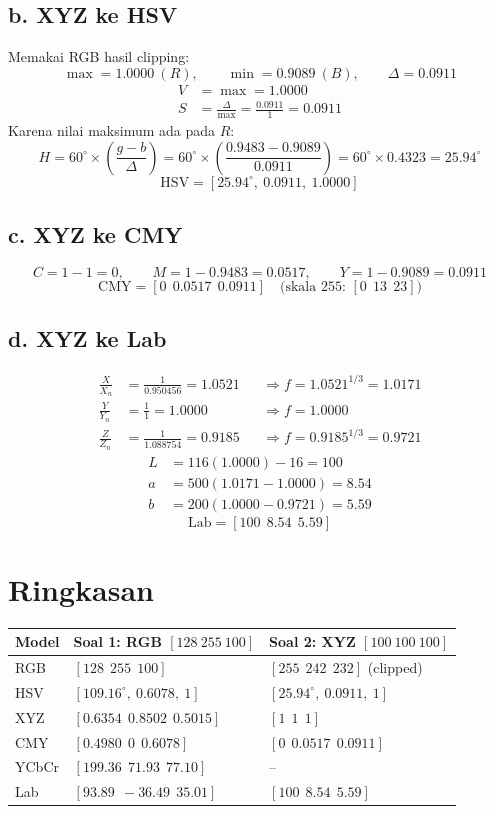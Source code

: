 \documentclass[11pt,a4paper]{article}
\begin{document}
\subsection*{b. XYZ ke HSV}
Memakai RGB hasil clipping:
\[
\max = 1.0000\ (R),\qquad \min = 0.9089\ (B),\qquad \Delta = 0.0911
\]
\begin{align*}
V &= \max = 1.0000\\
S &= \frac{\Delta}{\max} = \frac{0.0911}{1} = 0.0911
\end{align*}
Karena nilai maksimum ada pada $R$:
\[
H = 60^\circ \times \left(\frac{g - b}{\Delta}\right) = 60^\circ \times \left(\frac{0.9483 - 0.9089}{0.0911}\right) = 60^\circ \times 0.4323 = 25.94^\circ
\]
\[
\boxed{\text{HSV} = [25.94^\circ,\ 0.0911,\ 1.0000]}
\]

\subsection*{c. XYZ ke CMY}
\[
C = 1 - 1 = 0,\qquad M = 1 - 0.9483 = 0.0517,\qquad Y = 1 - 0.9089 = 0.0911
\]
\[
\boxed{\text{CMY} = [0\ \ 0.0517\ \ 0.0911]}\quad\text{(skala 255: } [0\ \ 13\ \ 23])
\]

\subsection*{d. XYZ ke Lab}
\begin{align*}
\frac{X}{X_n} &= \frac{1}{0.950456} = 1.0521 &&\Rightarrow f = 1.0521^{1/3} = 1.0171\\
\frac{Y}{Y_n} &= \frac{1}{1} = 1.0000 &&\Rightarrow f = 1.0000\\
\frac{Z}{Z_n} &= \frac{1}{1.088754} = 0.9185 &&\Rightarrow f = 0.9185^{1/3} = 0.9721
\end{align*}
\begin{align*}
L &= 116(1.0000) - 16 = 100\\
a &= 500(1.0171 - 1.0000) = 8.54\\
b &= 200(1.0000 - 0.9721) = 5.59
\end{align*}
\[
\boxed{\text{Lab} = [100\ \ 8.54\ \ 5.59]}
\]

\section*{Ringkasan}
\begin{center}
\begin{tabular}{lll}
\toprule
Model & Soal 1: RGB $[128\ 255\ 100]$ & Soal 2: XYZ $[100\ 100\ 100]$\\
\midrule
RGB   & $[128\ \ 255\ \ 100]$ & $[255\ \ 242\ \ 232]$ (clipped)\\
HSV   & $[109.16^\circ,\ 0.6078,\ 1]$ & $[25.94^\circ,\ 0.0911,\ 1]$\\
XYZ   & $[0.6354\ \ 0.8502\ \ 0.5015]$ & $[1\ \ 1\ \ 1]$\\
CMY   & $[0.4980\ \ 0\ \ 0.6078]$ & $[0\ \ 0.0517\ \ 0.0911]$\\
YCbCr & $[199.36\ \ 71.93\ \ 77.10]$ & --\\
Lab   & $[93.89\ \ -36.49\ \ 35.01]$ & $[100\ \ 8.54\ \ 5.59]$\\
\bottomrule
\end{tabular}
\end{center}
\end{document}
